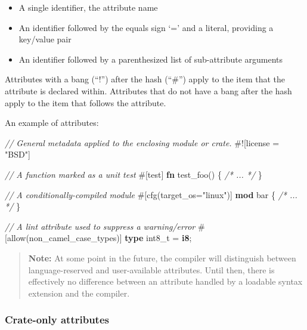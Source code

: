 \documentclass[]{article}
\newenvironment{Shaded}{}{}
\newcommand{\KeywordTok}[1]{\textcolor[rgb]{0.00,0.44,0.13}{\textbf{{#1}}}}
\newcommand{\StringTok}[1]{\textcolor[rgb]{0.25,0.44,0.63}{{#1}}}
\newcommand{\CommentTok}[1]{\textcolor[rgb]{0.38,0.63,0.69}{\textit{{#1}}}}
\newcommand{\OtherTok}[1]{\textcolor[rgb]{0.00,0.44,0.13}{{#1}}}
\newcommand{\NormalTok}[1]{{#1}}
\begin{document}
\begin{itemize}
\itemsep1pt\parskip0pt
\item
  A single identifier, the attribute name
\item
  An identifier followed by the equals sign `=' and a literal, providing
  a key/value pair
\item
  An identifier followed by a parenthesized list of sub-attribute
  arguments
\end{itemize}

Attributes with a bang (``!'') after the hash (``\#'') apply to the item
that the attribute is declared within. Attributes that do not have a
bang after the hash apply to the item that follows the attribute.

An example of attributes:

\begin{Shaded}
\begin{Highlighting}[]
\CommentTok{// General metadata applied to the enclosing module or crate.}
\NormalTok{#![license = }\StringTok{"BSD"}\NormalTok{]}

\CommentTok{// A function marked as a unit test}
\OtherTok{#[}\NormalTok{test}\OtherTok{]}
\KeywordTok{fn} \NormalTok{test_foo() \{}
  \CommentTok{/* ... */}
\NormalTok{\}}

\CommentTok{// A conditionally-compiled module}
\OtherTok{#[}\NormalTok{cfg}\OtherTok{(}\NormalTok{target}\OtherTok{_}\NormalTok{os}\OtherTok{=}\StringTok{"linux"}\OtherTok{)]}
\KeywordTok{mod} \NormalTok{bar \{}
  \CommentTok{/* ... */}
\NormalTok{\}}

\CommentTok{// A lint attribute used to suppress a warning/error}
\OtherTok{#[}\NormalTok{allow}\OtherTok{(}\NormalTok{non}\OtherTok{_}\NormalTok{camel}\OtherTok{_}\NormalTok{case}\OtherTok{_}\NormalTok{types}\OtherTok{)]}
\KeywordTok{type} \NormalTok{int8_t = }\KeywordTok{i8}\NormalTok{;}
\end{Highlighting}
\end{Shaded}

\begin{quote}
\textbf{Note:} At some point in the future, the compiler will
distinguish between language-reserved and user-available attributes.
Until then, there is effectively no difference between an attribute
handled by a loadable syntax extension and the compiler.
\end{quote}

\subsubsection{Crate-only attributes}\label{crate-only-attributes}
\end{document}

